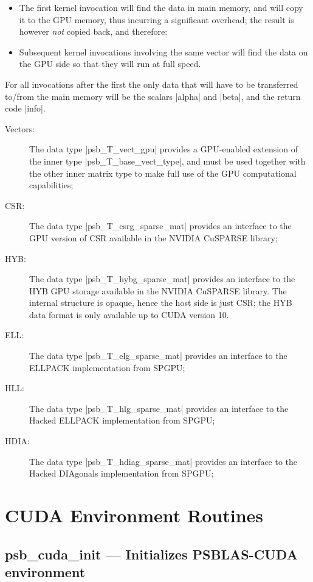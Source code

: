 \begin{itemize}
\item The first kernel invocation will find the data in main memory,
  and will copy it to the {GPU} memory, thus incurring a significant
  overhead; the result is however \emph{not} copied back, and
  therefore:
\item Subsequent kernel invocations involving the same vector will
  find the data on the {GPU} side so that they will run at full
  speed.
\end{itemize}
For all invocations after the first the only data that will have to be
transferred to/from the main memory will be the scalars \fortinline|alpha|
and \fortinline|beta|, and the return code \fortinline|info|.  

\begin{description}
\item[Vectors:] The data type \fortinline|psb_T_vect_gpu| provides a
  GPU-enabled extension of the inner type \fortinline|psb_T_base_vect_type|,
  and must be used together with the other inner matrix type to make
  full use of the GPU computational capabilities;
\item[CSR:] The data type \fortinline|psb_T_csrg_sparse_mat| provides an
  interface to the GPU version of CSR available in the NVIDIA CuSPARSE
  library;
\item[HYB:] The data type \fortinline|psb_T_hybg_sparse_mat| provides an
  interface to the HYB GPU storage  available in the NVIDIA CuSPARSE
  library. The internal structure is opaque, hence the host side is
  just CSR; the HYB data format is only available up to CUDA version
  10. 
\item[ELL:] The data type \fortinline|psb_T_elg_sparse_mat| provides an
  interface to the  ELLPACK implementation from SPGPU;

\item[HLL:] The data type \fortinline|psb_T_hlg_sparse_mat| provides an
  interface to the  Hacked ELLPACK implementation from SPGPU;
\item[HDIA:] The data type \fortinline|psb_T_hdiag_sparse_mat| provides an
  interface to the  Hacked DIAgonals implementation from SPGPU;
\end{description}


\section{CUDA Environment Routines}
\label{sec:cudaenv}

\subsection*{psb\_cuda\_init --- Initializes PSBLAS-CUDA
  environment}

